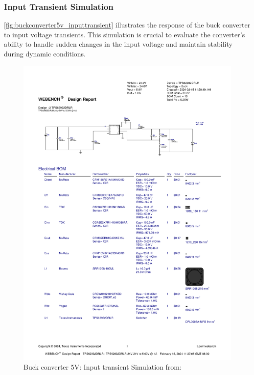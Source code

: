 \subsubsection{Input Transient Simulation}
\autoref{fig:buckconverter5v_inputtransient} illustrates the response of the buck converter to input voltage transients. This simulation is crucial to evaluate the converter's ability to handle sudden changes in the input voltage and maintain stability during dynamic conditions.
\begin{figure}[H]
    \centering
    \includegraphics[trim=0 205 0 70,clip,width=0.8\linewidth,page=8]{img//buckconverters//5v/WBDesign2_Input Transient.pdf}
    \caption{Buck converter 5V: Input transient Simulation from: %
    }
    \label{fig:buckconverter5v_inputtransient}
\end{figure}

